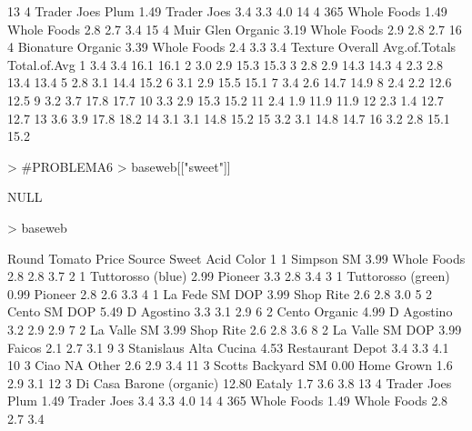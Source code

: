 \documentclass{article}
\begin{document}
\begin{Schunk}
\begin{Soutput}
13     4         Trader Joes Plum  1.49      Trader Joes   3.4  3.3   4.0
14     4          365 Whole Foods  1.49      Whole Foods   2.8  2.7   3.4
15     4        Muir Glen Organic  3.19      Whole Foods   2.9  2.8   2.7
16     4        Bionature Organic  3.39      Whole Foods   2.4  3.3   3.4
   Texture Overall Avg.of.Totals Total.of.Avg
1      3.4     3.4          16.1         16.1
2      3.0     2.9          15.3         15.3
3      2.8     2.9          14.3         14.3
4      2.3     2.8          13.4         13.4
5      2.8     3.1          14.4         15.2
6      3.1     2.9          15.5         15.1
7      3.4     2.6          14.7         14.9
8      2.4     2.2          12.6         12.5
9      3.2     3.7          17.8         17.7
10     3.3     2.9          15.3         15.2
11     2.4     1.9          11.9         11.9
12     2.3     1.4          12.7         12.7
13     3.6     3.9          17.8         18.2
14     3.1     3.1          14.8         15.2
15     3.2     3.1          14.8         14.7
16     3.2     2.8          15.1         15.2
\end{Soutput}
\begin{Sinput}
> #PROBLEMA6
> baseweb[["sweet"]]
\end{Sinput}
\begin{Soutput}
NULL
\end{Soutput}
\begin{Sinput}
> baseweb
\end{Sinput}
\begin{Soutput}
   Round                   Tomato Price           Source Sweet Acid Color
1      1               Simpson SM  3.99      Whole Foods   2.8  2.8   3.7
2      1        Tuttorosso (blue)  2.99          Pioneer   3.3  2.8   3.4
3      1       Tuttorosso (green)  0.99          Pioneer   2.8  2.6   3.3
4      1           La Fede SM DOP  3.99        Shop Rite   2.6  2.8   3.0
5      2             Cento SM DOP  5.49       D Agostino   3.3  3.1   2.9
6      2            Cento Organic  4.99       D Agostino   3.2  2.9   2.9
7      2              La Valle SM  3.99        Shop Rite   2.6  2.8   3.6
8      2          La Valle SM DOP  3.99           Faicos   2.1  2.7   3.1
9      3   Stanislaus Alta Cucina  4.53 Restaurant Depot   3.4  3.3   4.1
10     3                     Ciao    NA            Other   2.6  2.9   3.4
11     3       Scotts Backyard SM  0.00       Home Grown   1.6  2.9   3.1
12     3 Di Casa Barone (organic) 12.80           Eataly   1.7  3.6   3.8
13     4         Trader Joes Plum  1.49      Trader Joes   3.4  3.3   4.0
14     4          365 Whole Foods  1.49      Whole Foods   2.8  2.7   3.4

\end{Soutput}
\end{Schunk}
\end{document}
